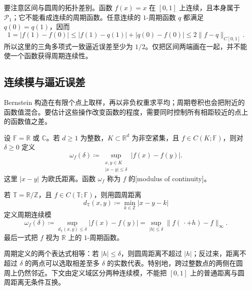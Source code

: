 \ProseParagraphBreak
要注意区间与圆周的拓扑差别。函数 \(f(x)=x\) 在 \([0,1]\) 上连续，且本身属于 \(\mathcal P_1\)；它不能看成连续的周期函数。任意连续的 \(1\)-周期函数 \(q\) 都满足 \(q(0)=q(1)\)，因而
\[
 1=|f(1)-f(0)|
 \leq|f(1)-q(1)|+|q(0)-f(0)|
 \leq2\lVert f-q\rVert_{C[0,1]}.
\]
所以这里的三角多项式一致逼近误差至少为 \(1/2\)。仅把区间两端画在一起，并不能使一个函数获得周期连续性。

\subsection{连续模与逼近误差}
\label{b2:subsec:020901}

Bernstein 构造在有限个点上取样，再以非负权重求平均；周期卷积也会把附近的函数值混合。要估计这些操作改变函数的程度，需要同时控制所有相距较近的点上的函数值之差。

\begin{definition}
\label{b2:def:approximation-modulus-continuity}
设 \(\mathbb F=\mathbb R\) 或 \(\mathbb C\)。若 \(d\geq1\) 为整数，\(K\subset\mathbb R^d\) 为非空紧集，且 \(f\in C(K;\mathbb F)\)，则对 \(\delta\geq0\) 定义
\[
 \omega_f(\delta)
 \coloneqq\sup_{\substack{x,y\in K\\|x-y|\leq\delta}}
             |f(x)-f(y)|.
\]
这里 \(|x-y|\) 为欧氏距离。函数 \(\omega_f\) 称为 \(f\) 的[modulus of continuity]。

\ProseParagraphBreak
若 \(\mathbb T=\mathbb R/\mathbb Z\)，且 \(f\in C(\mathbb T;\mathbb F)\)，则用圆周距离
\[
 d_{\mathbb T}(x,y)\coloneqq\min_{k\in\mathbb Z}|x-y-k|
\]
定义周期连续模
\[
 \omega_f(\delta)
 \coloneqq\sup_{d_{\mathbb T}(x,y)\leq\delta}|f(x)-f(y)|
 =\sup_{|h|\leq\delta}\lVert f(\,\cdot+h)-f\rVert_\infty.
\]
最后一式把 \(f\) 视为 \(\mathbb R\) 上的 \(1\)-周期函数。
\end{definition}

周期定义的两个表达式相等：若 \(|h|\leq\delta\)，则圆周距离不超过 \(|h|\)；反过来，距离不超过 \(\delta\) 的两点可以选取相差至多 \(\delta\) 的实数代表。特别地，跨过整数点的两侧在圆周上仍然邻近。下文由定义域区分两种连续模，不能把 \([0,1]\) 上的普通距离与圆周距离无条件互换。

